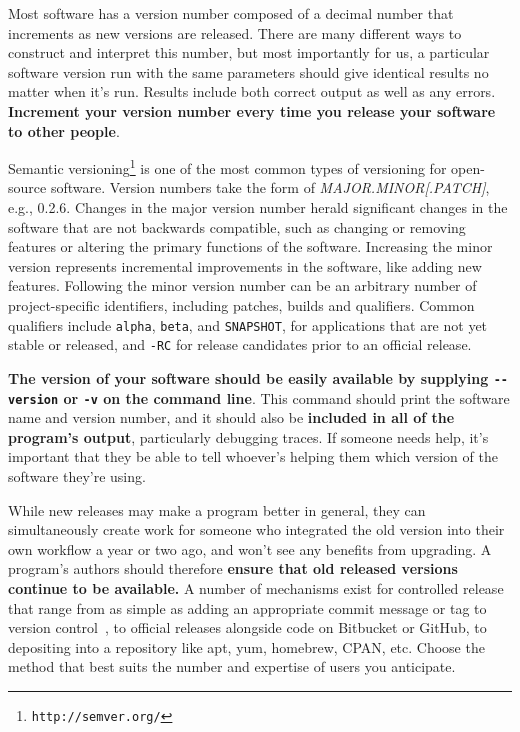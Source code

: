 \documentclass[10pt,letterpaper]{article}
\newcommand{\withurl}[2]{{#1}\footnote{\texttt{#2}}}
\begin{document}
Most software has a version number composed of a decimal number that
increments as new versions are released. 
There are many different ways
to construct and interpret this number, but most importantly for us, a
particular software version run with the same parameters should give
identical results no matter when it's run. Results include both correct
output as well as any errors.
\textbf{Increment your version number every time you release your software to
other people}.

\withurl{Semantic versioning}{http://semver.org/} is one of the most common
types of versioning for open-source software. Version numbers take the
form of \emph{MAJOR.MINOR{[}.PATCH{]}}, e.g., 0.2.6.
Changes in the major
version number herald significant changes in the software that are not
backwards compatible, such as changing or removing features or altering
the primary functions of the software. Increasing the minor version
represents incremental improvements in the software, like adding new
features. Following the minor version number can be an arbitrary number
of project-specific identifiers, including patches, builds and qualifiers.
Common qualifiers include \texttt{alpha}, \texttt{beta}, and \texttt{SNAPSHOT},
for applications that are
not yet stable or released, and \texttt{-RC} for release candidates prior
to an official release.

\textbf{The version of your software should be easily available by 
supplying \texttt{-\/-version} or \texttt{-v} on the command line}. This command should print
the software name and version number, and it should
also be \textbf{included in all of the program's output}, particularly debugging
traces.  If someone needs help, it's important that they be able to tell
whoever's helping them which version of the software they're using.

While new releases may make a program better in general,
they can simultaneously create work for someone
who integrated the old version into their own workflow a year or two ago,
and won't see any benefits from upgrading.
A program's authors should therefore \textbf{ensure that old released versions
continue to be available.}
A number of mechanisms exist for
controlled release that range from as simple as adding an appropriate
commit message or tag to version control~\cite{blischak2016}, to official releases alongside
code on Bitbucket or GitHub, to depositing into a
repository like apt, yum, homebrew, CPAN, etc. Choose the method that
best suits the number and expertise of users you anticipate.
\end{document}
